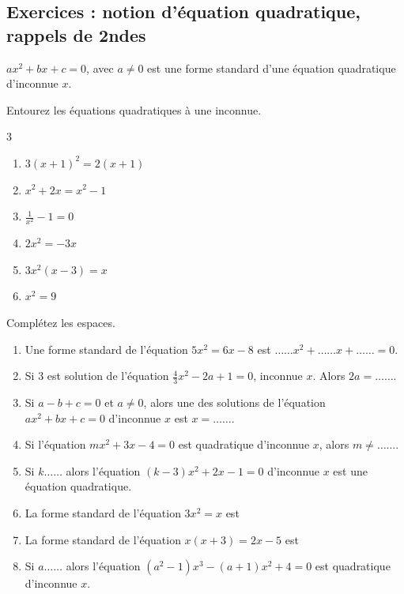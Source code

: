 \documentclass[main.tex]{subfiles}
\begin{document}
\newpage 
{}  
\pagestyle{scrheadings} %
\onehalfspacing
\subsection{Exercices : notion d'équation quadratique, rappels de 2ndes} 
\begin{eBox}
$ax^2+bx+c=0$, avec $a\neq0$ est une forme standard d'une équation quadratique d'inconnue $x$.
\end{eBox}
\begin{exercise} Entourez les équations quadratiques à une inconnue.
\vspace{-1em}
\begin{multicols}{3}
	\begin{enumerate}[label={$(E_{\arabic*})$\rule{0pt}{1.8em}}, leftmargin=*]
		\item $3(x+1)^2=2(x+1)$
		\item $x^2+2x=x^2-1$
		\item $\frac{1}{x^2}-1=0$ 
		\item $2x^2=-3x$
		\item $3x^2(x-3)=x$
		\item $x^2=9$
	\end{enumerate}
\end{multicols}  
\end{exercise}
\vspace{-1em}
\begin{exercise} Complétez les espaces.
\begin{enumerate}[label={\arabic*)\rule{0pt}{1.8em}},leftmargin=*]
	\item Une forme standard de l'équation $5x^2=6x-8$ est $\ldots\ldots x^2+ \ldots\ldots x+\ldots\ldots =0$.
	\item Si $3$ est solution de l'équation $\tfrac{4}{3}x^2-2a+1=0$, inconnue $x$. Alors $2a=\ldots\ldots$.
	\item Si $a-b+c=0$ et $a\neq 0$, alors une des solutions de l'équation $ax^2+bx+c=0$ d'inconnue $x$ est $x=
	\ldots\ldots$. 
	\item Si l'équation $mx^2+3x-4=0$ est quadratique d'inconnue $x$, alors $m\neq \ldots\ldots$.
	\item Si $k\ldots\ldots$ alors l'équation $(k-3)x^2+2x-1=0$ d'inconnue $x$ est une équation quadratique.
	\item La forme standard de l'équation $3x^2=x$ est \dotfill
	\item  La forme standard de l'équation $x(x+3)=2x-5$ est \dotfill
	\item Si $a\ldots\ldots$ alors l'équation $(a^2-1)x^3-(a+1)x^2+4=0$ est  quadratique d'inconnue $x$.
\end{enumerate}
\end{exercise}
\end{document}
